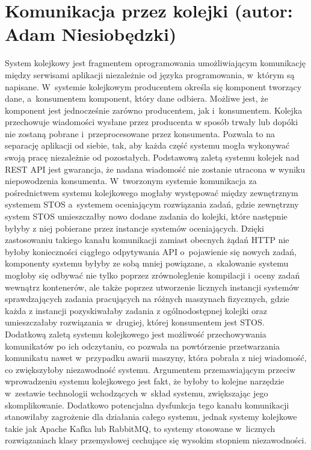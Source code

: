 \section{Komunikacja przez kolejki (autor: Adam Niesiobędzki)}
System kolejkowy jest fragmentem oprogramowania umożliwiającym komunikację między serwisami aplikacji niezależnie od języka programowania, w~którym są napisane. W~systemie kolejkowym producentem określa się komponent tworzący dane, a~konsumentem komponent, który dane odbiera. Możliwe jest, że komponent jest jednocześnie zarówno producentem, jak i~konsumentem. Kolejka przechowuje wiadomości wysłane przez producenta w sposób trwały lub dopóki nie zostaną pobrane i~przeprocesowane przez konsumenta. Pozwala to na separację aplikacji od siebie, tak, aby każda część systemu mogła wykonywać swoją pracę niezależnie od pozostałych. Podstawową zaletą systemu kolejek nad REST API jest gwarancja, że nadana wiadomość nie zostanie utracona w wyniku niepowodzenia konsumenta. W~tworzonym systemie komunikacja za pośrednictwem systemu kolejkowego mogłaby występować między zewnętrznym systemem STOS a~systemem oceniającym rozwiązania zadań, gdzie zewnętrzny system STOS umieszczałby nowo dodane zadania do kolejki, które następnie byłyby z niej pobierane przez instancje systemów oceniających. Dzięki zastosowaniu takiego kanału komunikacji zamiast obecnych żądań HTTP nie byłoby konieczności ciągłego odpytywania API o~pojawienie się nowych zadań, komponenty systemu byłyby ze sobą mniej powiązane, a~skalowanie systemu mogłoby się odbywać nie tylko poprzez zrównoleglenie kompilacji i~oceny zadań wewnątrz kontenerów, ale także poprzez utworzenie licznych instancji systemów sprawdzających zadania pracujących na różnych maszynach fizycznych, gdzie każda z instancji pozyskiwałaby zadania z ogólnodostępnej kolejki oraz umieszczałaby rozwiązania w~drugiej, której konsumentem jest STOS. Dodatkową zaletą systemu kolejkowego jest możliwość przechowywania komunikatów po ich odczytaniu, co pozwala na powtórzenie przetwarzania komunikatu nawet w~przypadku awarii maszyny, która pobrała z niej wiadomość, co zwiększyłoby niezawodność systemu. Argumentem przemawiającym przeciw wprowadzeniu systemu kolejkowego jest fakt, że byłoby to kolejne narzędzie w~zestawie technologii wchodzących w~skład systemu, zwiększając jego skomplikowanie. Dodatkowo potencjalna dysfunkcja tego kanału komunikacji stanowiłaby zagrożenie dla działania całego systemu, jednak systemy kolejkowe takie jak Apache Kafka lub RabbitMQ, to systemy stosowane w~licznych rozwiązaniach klasy przemysłowej cechujące się wysokim stopniem niezawodności.
